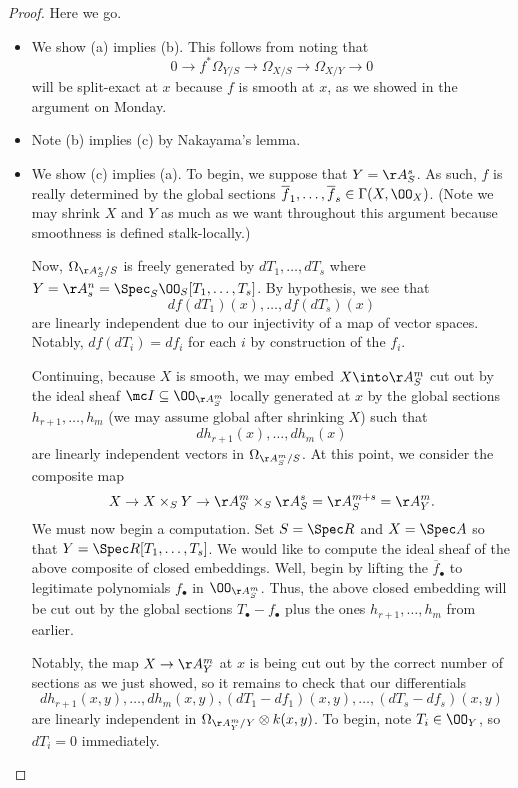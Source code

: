 \documentclass[../notes.tex]{subfiles}
\begin{document}
\begin{proof}
	Here we go.
	\begin{itemize}
		\item We show (a) implies (b). This follows from noting that
		\[0\to f^*\Omega_{Y/S}\to\Omega_{X/S}\to\Omega_{X/Y}\to0\]
		will be split-exact at $x$ because $f$ is smooth at $x$, as we showed in the argument on Monday.
		\item Note (b) implies (c) by Nakayama's lemma.
		\item We show (c) implies (a). To begin, we suppose that $Y=\AA^s_S$. As such, $f$ is really determined by the global sections $\overline f_1,\ldots,\overline f_s\in\Gamma(X,\OO_X)$. (Note we may shrink $X$ and $Y$ as much as we want throughout this argument because smoothness is defined stalk-locally.)
		
		Now, $\Omega_{\AA^s_S/S}$ is freely generated by $dT_1,\ldots,dT_s$ where $Y=\AA^n_s=\Spec_S\OO_S[T_1,\ldots,T_s]$. By hypothesis, we see that
		\[df(dT_1)(x),\ldots,df(dT_s)(x)\]
		are linearly independent due to our injectivity of a map of vector spaces. Notably, $df(dT_i)=df_i$ for each $i$ by construction of the $f_i$.

		Continuing, because $X$ is smooth, we may embed $X\into\AA^m_S$ cut out by the ideal sheaf $\mc I\subseteq\OO_{\AA^m_S}$ locally generated at $x$ by the global sections $h_{r+1},\ldots,h_m$ (we may assume global after shrinking $X$) such that
		\[dh_{r+1}(x),\ldots,dh_m(x)\]
		are linearly independent vectors in $\Omega_{\AA^m_S/S}$. At this point, we consider the composite map
		\[X\to X\times_SY\to\AA^m_S\times_S\AA^s_S=\AA^{m+s}_S=\AA^m_Y.\]
		We must now begin a computation. Set $S=\Spec R$ and $X=\Spec A$ so that $Y=\Spec R[T_1,\ldots,T_s]$. We would like to compute the ideal sheaf of the above composite of closed embeddings. Well, begin by lifting the $\overline f_\bullet$ to legitimate polynomials $f_\bullet$ in $\OO_{\AA^m_S}$. Thus, the above closed embedding will be cut out by the global sections $T_\bullet-f_\bullet$ plus the ones $h_{r+1},\ldots,h_m$ from earlier.

		Notably, the map $X\to\AA^m_Y$ at $x$ is being cut out by the correct number of sections as we just showed, so it remains to check that our differentials
		\[dh_{r+1}(x,y),\ldots,dh_m(x,y),(dT_1-df_1)(x,y),\ldots,(dT_s-df_s)(x,y)\]
		are linearly independent in $\Omega_{\AA^m_Y/Y}\otimes k(x,y)$. To begin, note $T_i\in\OO_Y$, so $dT_i=0$ immediately.


\end{itemize}
\end{proof}
\end{document}
